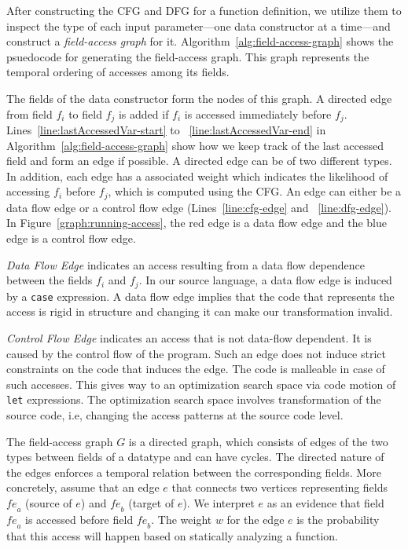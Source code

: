 \documentclass[acmsmall,review,anonymous]{acmart}\settopmatter{printfolios=true,printccs=false,printacmref=false}
\newcommand{\Figref}[1]{Figure~\ref{#1}\xspace}
\newcommand{\skeywd}[1]{\mathit{#1}}
\newcommand{\fields}{\skeywd{fe}}
\newcommand{\CFG}[0]{CFG\xspace}
\newcommand{\DFG}[0]{DFG\xspace}
\begin{document}

After constructing the \CFG and \DFG for a function definition, we utilize them to inspect the type
of each input parameter---one data constructor at a time---and construct
a \emph{field-access graph} for it.
Algorithm~\ref{alg:field-access-graph} shows the psuedocode for generating the field-access graph. 
This graph represents the temporal ordering of accesses among its fields.

The fields of the data constructor form the nodes of this graph.
A directed edge from field $f_i$ to field $f_j$ is added if $f_i$ is accessed immediately before $f_j$. Lines~\ref{line:lastAccessedVar-start} to ~\ref{line:lastAccessedVar-end}
in Algorithm~\ref{alg:field-access-graph} show how we keep track of the last accessed field and form an edge if possible. 
A directed edge can be of two different types. In addition, each edge has a associated weight which indicates the likelihood of accessing $f_i$ before $f_j$, which is computed using the \CFG.
An edge can either be a data flow edge or a control flow edge (Lines~\ref{line:cfg-edge} and ~\ref{line:dfg-edge}). In \Figref{graph:running-access}, the red edge is a data flow edge and the blue edge is a control flow edge.

\textit{Data Flow Edge} indicates an access resulting from a data flow dependence between the fields $f_i$ and $f_j$. In our source language, a data flow edge is induced by
a \lstinline|case| expression.
A data flow edge implies that the code that represents the access is rigid in structure and changing it can make our transformation invalid.

\textit{Control Flow Edge} indicates an access that is not data-flow dependent. It is caused by the control flow of the program. Such an edge does not induce strict constraints on the code that induces the edge. The code is malleable in case of such accesses. This gives way to an optimization search space via code motion of \lstinline|let| expressions. The optimization search space involves transformation of the source code, i.e, changing the access patterns at the source code level.












The field-access graph $G$ is a directed graph, which consists of edges of the two types between fields of a datatype and can have cycles. The directed nature of the edges enforces a temporal relation between the corresponding fields. More concretely, assume that an edge $e$ that connects two vertices representing fields $\fields_{a}$ (source of $e$) and $\fields_{b}$ (target of $e$). We interpret $e$ as an evidence that field $\fields_{a}$ is accessed before field $\fields_{b}$. The weight $w$ for the edge $e$ is the probability that this access will happen based on statically analyzing a function. 
\end{document}
